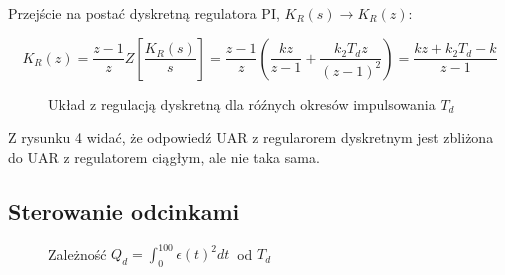 \documentclass{article}
\begin{document}
Przejście na postać dyskretną regulatora PI, \(K_R(s) \rightarrow K_R(z) \):

\begin{equation}
K_R(z)=\frac{z-1}{z} Z \left[ \frac{K_R(s)}{s} \right] = \frac{z-1}{z} (\frac{kz}{z-1}  + \frac{k_2 T_d z}{(z-1)^2}) = \frac{kz + k_2 T_d - k}{z-1} 
\end{equation}

\pagebreak
\begin{figure}[ht]
\centering
{}
\caption{Układ z regulacją dyskretną dla róźnych okresów impulsowania \(T_d\)}
\end{figure}

Z rysunku 4 widać, że odpowiedź UAR z regularorem dyskretnym jest zbliżona do UAR z regulatorem ciągłym, ale nie taka sama.

\subsection{Sterowanie odcinkami}

\begin{figure}[ht]
\centering
{}
\caption{Zależność \( Q_d = \int_{0}^{100} \epsilon(t)^2  dt\ \) od \(T_d\)}
\end{figure}
\end{document}
